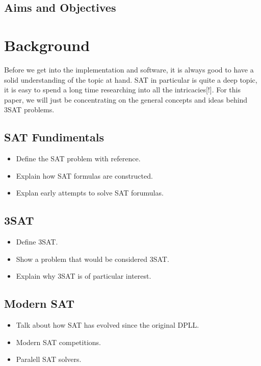 \documentclass{article}
\begin{document}
\subsection{Aims and Objectives}

\section{Background}
Before we get into the implementation and software, it is always good to have a solid understanding
of the topic at hand. SAT in particular is quite a deep topic, it is easy to spend a long time
researching into all the intricacies[!]. For this paper, we will just be concentrating on the
general concepts and ideas behind 3SAT problems.


\subsection{SAT Fundimentals}
\begin{itemize}
    \item Define the SAT problem with reference.
    \item Explain how SAT formulas are constructed.
    \item Explan early attempts to solve SAT forumulas.
\end{itemize}

\subsection{3SAT}
\begin{itemize}
    \item Define 3SAT.
    \item Show a problem that would be considered 3SAT.
    \item Explain why 3SAT is of particular interest.
\end{itemize}

\subsection{Modern SAT}
\begin{itemize}
    \item Talk about how SAT has evolved since the original DPLL.
    \item Modern SAT competitions.
    \item Paralell SAT solvers.
\end{itemize}
\end{document}
